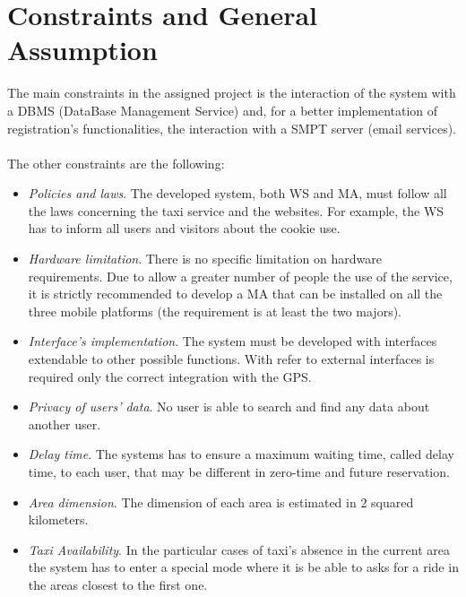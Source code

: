 \section{Constraints and General Assumption}
The main constraints in the assigned project is the interaction of the system with a DBMS (DataBase Management Service) and, for a better implementation of registration's functionalities, the interaction with a SMPT server (email services).\\
\\
The other constraints are the following:
\begin{itemize}
	\item \textit{Policies and laws}. The developed system, both WS and MA, must follow all the laws concerning the taxi service and the websites. For example, the WS has to inform all users and visitors about the cookie use.
	\item \textit{Hardware limitation}. There is no specific limitation on hardware requirements. Due to allow a greater number of people the use of the service, it is strictly recommended to develop a MA that can be installed on all the three mobile platforms (the requirement is at least the two majors).
	\item \textit{Interface's implementation}. The system must be developed with interfaces extendable to other possible functions. With refer to external interfaces is required only the correct integration with the GPS.
	\item \textit{Privacy of users' data}. No user is able to search and find any data about another user.
	\item \textit{Delay time}. The systems has to ensure a maximum waiting time, called delay time, to each user, that may be different in zero-time and future reservation.
	\item \textit{Area dimension}. The dimension of each area is estimated in 2 squared kilometers.
	\item \textit{Taxi Availability}. In the particular cases of taxi's absence in the current area the system has to enter a special mode where it is be able to asks for a ride in the areas closest to the first one.
\end{itemize}

